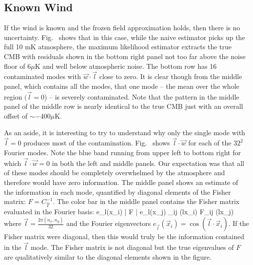\subsection{Known Wind}

If the wind is known and the frozen field approximation holds, then there is no uncertainty. Fig.~ shows that in this case, while the naive estimator picks up the full 10 mK atmosphere, the maximum likelihood estimator extracts the true CMB with residuals shown in the bottom right panel not too far above the noise floor of 6$\mu$K and well below atmospheric noise. The bottom row has 16 contaminated modes with $\vec w\cdot \vec l$ close to zero. It is clear though from the middle panel, which contains all the modes, that one mode -- the mean over the whole region $(\vec l=0$) -- is severely contaminated. Note that the pattern in the middle panel of the middle row is nearly identical to the true CMB just with an overall offset of $\sim -400\mu$K.


As an aside, it is interesting to try to understand why only the single mode with $\vec l=0$ produces most of the contamination. Fig.~ shows $\vec l\cdot \vec w$ for each of the $32^2$ Fourier modes. Note the blue band running from upper left to bottom right for which $\vec l\cdot \vec w=0$ in both the left and middle panels. Our expectation was that all of these modes should be completely overwhelmed by the atmosphere and therefore would have zero information. The middle panel shows an estimate of the information in each mode, quantified by diagonal elements of the Fisher matrix: $F=C_{\hat T}^{-1}$. The color bar in the middle panel contains the Fisher matrix evaluated in the Fourier basis:
\be
\langle e_{\vec l}(\vec x_i) | F | e_{\vec l}(\vec x_j) \rangle\equiv \sum_{ij} \cos(\vec l\cdot\vec x_i) F_{ij} \cos(\vec l\cdot\vec x_j)
\ee
where $\vec l=\frac{2\pi(n_x,n_y)}{32}$ and the Fourier eigenvectors $e_{\vec l}(\vec x_i) = \cos(\vec l\cdot\vec x_i)$. If the Fisher matrix were diagonal, then this would truly be the information contained in the $\vec l$ mode. The Fisher matrix is not diagonal but the true eigenvalues of $F$ are qualitatively similar to the diagonal elements shown in the figure.


